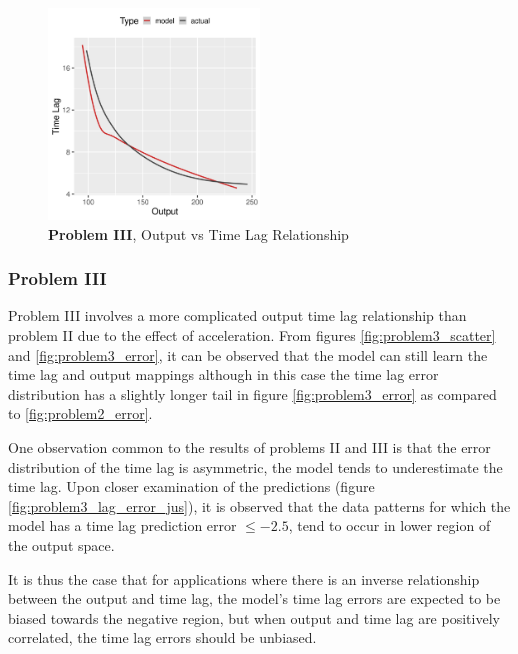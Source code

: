 \documentclass[runningheads]{llncs}
\begin{document}
\begin{figure}[h]
\vspace{.3in}
\centerline{\includegraphics[width=0.5\textwidth]{figures/exp3_predictive_curves.png}}
\vspace{.3in}
\caption{\textbf{Problem III}, Output vs Time Lag Relationship}
\label{fig:problem3_curves}
\end{figure}


\subsubsection{Problem III}

Problem III involves a more complicated output time lag relationship than problem II due to the 
effect of acceleration. From figures \ref{fig:problem3_scatter} and \ref{fig:problem3_error}, 
it can be observed that the model can still learn the time lag and output mappings although 
in this case the time lag error distribution has a slightly longer tail in figure 
\ref{fig:problem3_error} as compared to \ref{fig:problem2_error}.

One observation common to the results of problems II and III is that the error distribution of 
the time lag is asymmetric, the model tends to underestimate the time lag. Upon closer examination 
of the predictions (figure \ref{fig:problem3_lag_error_jus}), it is observed that the data patterns 
for which the model has a time lag prediction error $\leq -2.5$, tend to occur in lower region of 
the output space. %

It is thus the case that for applications where there is an inverse relationship between the output 
and time lag, the model's time lag errors are expected to be biased towards the negative region, 
but when output and time lag are positively correlated, the time lag errors should be unbiased.
\end{document}
